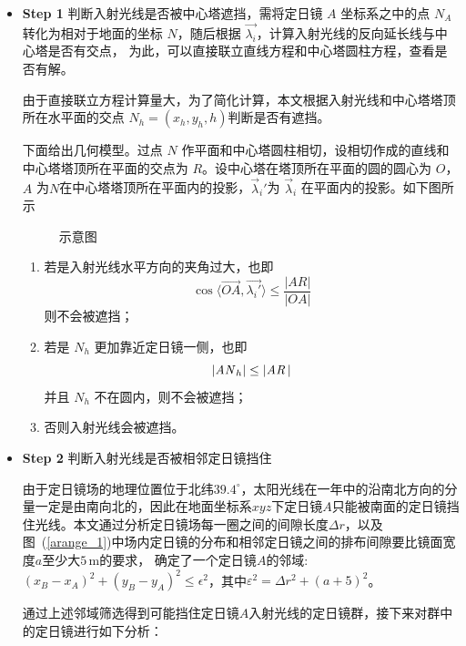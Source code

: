 \documentclass[../main.tex]{subfiles}
\begin{document}
\begin{itemize}
\item \textbf{Step 1} 判断入射光线是否被中心塔遮挡，需将定日镜 \(A\) 坐标系之中的点 \(N_{A}\) 转化为相对于地面的坐标 \(N\)，随后根据 \(\vec {\lambda _{i}}\)，计算入射光线的反向延长线与中心塔是否有交点，
为此，可以直接联立直线方程和中心塔圆柱方程，查看是否有解。

由于直接联立方程计算量大，为了简化计算，本文根据入射光线和中心塔塔顶所在水平面的交点 \(N_{h} = (x _{h} , y_{h}, h)\)判断是否有遮挡。

下面给出几何模型。过点 \(N\) 作平面和中心塔圆柱相切，设相切作成的直线和中心塔塔顶所在平面的交点为 \(R\)。设中心塔在塔顶所在平面的圆的圆心为 \(O\)，\(A\) 为\(N\)在中心塔塔顶所在平面内的投影，\(\vec \lambda _{i} '\)为 \(\vec \lambda _{i}\) 在平面内的投影。如下图所示
%
\begin{figure}[H]
\centering

\caption{\kaishu 示意图}\label{fig:ta}
\end{figure}
%
\begin{enumerate}
\item 若是入射光线水平方向的夹角过大，也即
\begin{equation}
\cos \langle \overrightarrow {OA}, \vec {\lambda _{i} '} \rangle \le \frac{\vert AR \vert }{\vert OA \vert }
\end{equation}
则不会被遮挡；
\item 若是 \(N_{h}\) 更加靠近定日镜一侧，也即
\begin{equation}
\vert {\it A N}_{h}\vert \le \vert {\it AR\,} \vert
\end{equation}并且 \(N_{h}\) 不在圆内，则不会被遮挡；
\item 否则入射光线会被遮挡。
\end{enumerate}
\item \textbf{Step 2} 判断入射光线是否被相邻定日镜挡住

由于定日镜场的地理位置位于北纬\(39.4^{\circ}\)，太阳光线在一年中的沿南北方向的分量一定是由南向北的，因此在地面坐标系\(xyz\)下定日镜\(A\)只能被南面的定日镜挡住光线。本文通过分析定日镜场每一圈之间的间隙长度\(\Delta r\)，以及图~(\ref{arange_1})中场内定日镜的分布和相邻定日镜之间的排布间隙要比镜面宽度\(a\)至少大\(5 \, \mathrm{m}\)的要求，
确定了一个定日镜\(A\)的邻域:\((x_B - x_A)^2 + (y_B - y_A)^2 \le \epsilon^2\)，其中\(\varepsilon^2=\Delta r^2+(a+5)^2\)。

通过上述邻域筛选得到可能挡住定日镜\(A\)入射光线的定日镜群，接下来对群中的定日镜进行如下分析：


\end{itemize}
\end{document}
